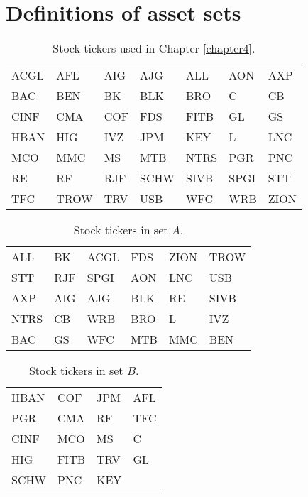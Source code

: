 \documentclass[12pt,a4paper]{report}
\begin{document}
\section{Definitions of asset sets}
\begin{center}
\begin{table}[H]
\centering
\begin{tabular}{lllllll}
\toprule
 ACGL &   AFL &  AIG &   AJG &   ALL &   AON &   AXP \\
  BAC &   BEN &   BK &   BLK &   BRO &     C &    CB \\
 CINF &   CMA &  COF &   FDS &  FITB &    GL &    GS \\
 HBAN &   HIG &  IVZ &   JPM &   KEY &     L &   LNC \\
   MCO &   MMC &   MS &   MTB &  NTRS &   PGR &   PNC \\
   RE &    RF &  RJF &  SCHW &  SIVB &  SPGI &   STT \\
   TFC &  TROW &  TRV &   USB &   WFC &   WRB &  ZION \\
   \bottomrule
\end{tabular}
\caption{Stock tickers used in Chapter \ref{chapter4}.}
\label{table:stock_tickers_used}
\end{table}

\begin{table}[H]
\centering
\begin{tabular}{llllll}
\toprule
ALL &   BK &  ACGL &  FDS &  ZION &  TROW \\
 STT &  RJF &  SPGI &  AON &   LNC &   USB \\
 AXP &  AIG &   AJG &  BLK &    RE &  SIVB \\
 NTRS &   CB &   WRB &  BRO &     L &   IVZ \\
  BAC &   GS &   WFC &  MTB &   MMC &   BEN \\
  \bottomrule
\end{tabular}
\caption{Stock tickers in set $A$.}
\label{table:stock_tickers_in_set_A}
\end{table}


\begin{table}[H]
\centering
\begin{tabular}{llll}
\toprule
 HBAN &   COF &  JPM &  AFL \\
 PGR &   CMA &   RF &  TFC \\
 CINF &   MCO &   MS &    C \\
  HIG &  FITB &  TRV &   GL \\
 SCHW &   PNC &  KEY &     \\
 \bottomrule
\end{tabular}
\caption{Stock tickers in set $B$.}
\label{table:stock_tickers_in_set_B}
\end{table}


\end{center}
\end{document}

